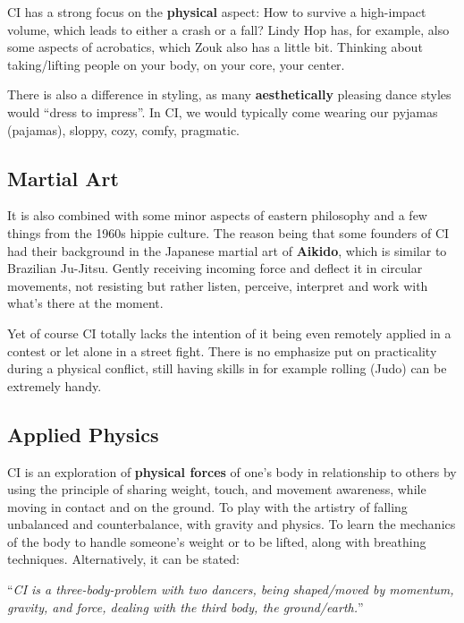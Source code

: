 CI has a strong focus on the \textbf{physical} aspect: How to survive a high-impact volume, which leads to either a crash or a fall?
Lindy Hop has, for example, also some aspects of acrobatics, which Zouk also has a little bit.
Thinking about taking/lifting people on your body, on your core, your center.

There is also a difference in styling, as many \textbf{aesthetically} pleasing dance styles would ``dress to impress''.
In CI, we would typically come wearing our pyjamas (pajamas), sloppy, cozy, comfy, pragmatic.

\subsection{Martial Art}\label{subsec:martial-art}

It is also combined with some minor aspects of eastern philosophy and a few things from the 1960s hippie culture.
The reason being that some founders of CI had their background in the Japanese martial art of \textbf{Aikido}, which is similar to Brazilian Ju-Jitsu.
Gently receiving incoming force and deflect it in circular movements, not resisting but rather listen, perceive, interpret and work with what's there at the moment.

Yet of course CI totally lacks the intention of it being even remotely applied in a contest or let alone in a street fight.
There is no emphasize put on practicality during a physical conflict, still having skills in for example rolling (Judo) can be extremely handy.

\subsection{Applied Physics}\label{subsec:applied-physics}

CI is an exploration of \textbf{physical forces} of one's body in relationship to others by using the principle of sharing weight, touch, and movement awareness, while moving in contact and on the ground.
To play with the artistry of falling unbalanced and counterbalance, with gravity and physics.
To learn the mechanics of the body to handle someone's weight or to be lifted, along with breathing techniques.
Alternatively, it can be stated:

\begin{center}
	``\textit{CI is a three-body-problem with two dancers, being shaped/moved by momentum, gravity, and force, dealing with the third body, the ground/earth.}''
\end{center}

